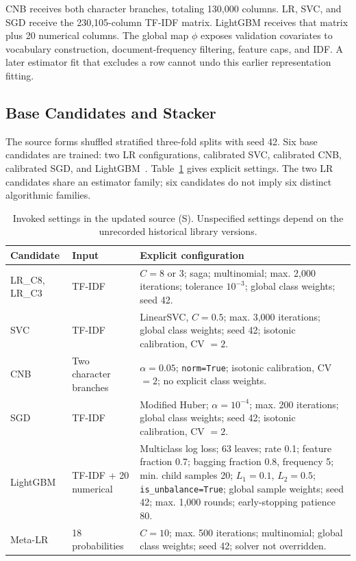 \documentclass[doublecolumn]{ijcvsplatex}
\begin{document}
CNB receives both character branches, totaling 130,000 columns. LR, SVC, and SGD receive the 230,105-column TF-IDF matrix. LightGBM receives that matrix plus 20 numerical columns. The global map $\phi$ exposes validation covariates to vocabulary construction, document-frequency filtering, feature caps, and IDF. A later estimator fit that excludes a row cannot undo this earlier representation fitting.

\subsection{Base Candidates and Stacker}
The source forms shuffled stratified three-fold splits with seed 42. Six base candidates are trained: two LR configurations, calibrated SVC, calibrated CNB, calibrated SGD, and LightGBM~\cite{ke2017lightgbm}. Table~\ref{tab:configs} gives explicit settings. The two LR candidates share an estimator family; six candidates do not imply six distinct algorithmic families.

\begin{table}[t]
\small\centering
\caption{Invoked settings in the updated source (S). Unspecified settings depend on the unrecorded historical library versions.}
\label{tab:configs}
\begin{tabularx}{\textwidth}{llX}
\toprule
Candidate & Input & Explicit configuration \\
\midrule
LR\_C8, LR\_C3 & TF-IDF & $C=8$ or 3; saga; multinomial; max. 2,000 iterations; tolerance $10^{-3}$; global class weights; seed 42. \\
SVC & TF-IDF & LinearSVC, $C=0.5$; max. 3,000 iterations; global class weights; seed 42; isotonic calibration, CV $=2$. \\
CNB & Two character branches & $\alpha=0.05$; \texttt{norm=True}; isotonic calibration, CV $=2$; no explicit class weights. \\
SGD & TF-IDF & Modified Huber; $\alpha=10^{-4}$; max. 200 iterations; global class weights; seed 42; isotonic calibration, CV $=2$. \\
LightGBM & TF-IDF + 20 numerical & Multiclass log loss; 63 leaves; rate 0.1; feature fraction 0.7; bagging fraction 0.8, frequency 5; min. child samples 20; $L_1=0.1$, $L_2=0.5$; \texttt{is\_unbalance=True}; global sample weights; seed 42; max. 1,000 rounds; early-stopping patience 80. \\
Meta-LR & 18 probabilities & $C=10$; max. 500 iterations; multinomial; global class weights; seed 42; solver not overridden. \\
\bottomrule
\end{tabularx}
\end{table}
\end{document}
